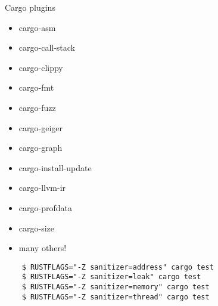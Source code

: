 \begin{frame}{\insertsubsection}
  Cargo plugins

  \begin{itemize}
  \item cargo-asm
  \item cargo-call-stack
  \item cargo-clippy
  \item cargo-fmt
  \item cargo-fuzz
  \item cargo-geiger
  \item cargo-graph
  \item cargo-install-update
  \item cargo-llvm-ir
  \item cargo-profdata
  \item cargo-size
  \item many others!
  \end{itemize}


\end{frame}

\begin{frame}[fragile]{\insertsubsection}
  \begin{verbatim}
    $ RUSTFLAGS="-Z sanitizer=address" cargo test
    $ RUSTFLAGS="-Z sanitizer=leak" cargo test
    $ RUSTFLAGS="-Z sanitizer=memory" cargo test
    $ RUSTFLAGS="-Z sanitizer=thread" cargo test
  \end{verbatim}

\end{frame}

